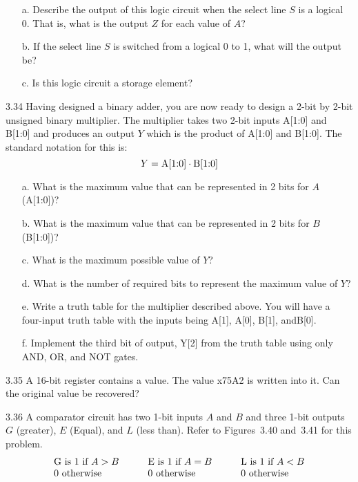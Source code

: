 \documentclass{patt}
\begin{document}
\begin{exercises}
\begin{enumerate}[a.]
\item[a.] Describe the output of this logic circuit when the select
  line $S$ is a logical 0. That is, what is the output $Z$ for each
  value of $A$?
\item[b.] If the select line $S$ is switched from a logical 0 to 1,
  what will the output be?
\item[c.] Is this logic circuit a storage element?
\end{enumerate}\vfill\pagebreak

\item[3.34] Having designed a binary adder, you are now ready to
  design a 2-bit by 2-bit unsigned binary multiplier. The multiplier
  takes two 2-bit inputs A[1:0] and B[1:0] and produces an output $Y$
  which is the product of A[1:0] and B[1:0]. The standard notation for
  this is:
\begin{equation*}
Y={\rm A}[1{:}0] \cdot {\rm B}[1{:}0]
\end{equation*}
\vspace{-2.5\belowdisplayskip}
\begin{enumerate}[a.]
\item [a.] What is the maximum value that can be represented in 2 bits
  for $A$(A[1:0])?
\item [b.] What is the maximum value that can be represented in 2 bits
  for $B$(B[1:0])?
\item [c.] What is the maximum possible value of $Y$?
\item[d.] What is the number of required bits to represent the maximum
  value of $Y$?
\item[e.] Write a truth table for the multiplier described above. You
  will have a four-input truth table with the inputs being A[1], A[0],
  B[1], and\break B[0].
\item [f.] Implement the third bit of output, Y[2] from the truth
  table using only AND, OR, and NOT gates.
\end{enumerate}



\item[3.35] A 16-bit register contains a value. The value x75A2 is
  written into it. Can the original value be recovered?\vfill\pagebreak

\item[3.36] A comparator circuit has two 1-bit inputs $A$ and $B$ and
  three 1-bit outputs $G$ (greater), $E$ (Equal), and $L$ (less than).
  Refer to Figures~3.40 and~3.41 for this problem.
\begin{alignat*}{6}
  & \text{G is 1 if $A>B$} &&\qquad \text{E is 1 if $A=B$} &&\qquad \text{L is 1 if $A<B$}\\[-\jot]
  &\text{0 otherwise} &&\qquad \text{0 otherwise} &&\qquad \text{0
    otherwise}
\end{alignat*}




\end{exercises}
\end{document}
